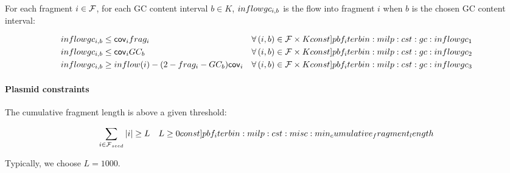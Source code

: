 For each fragment \(i \in \mathcal{F}{}\), for each GC content interval \(b \in K\), \(inflowgc_{i, b}\) is the flow into fragment \(i\) when \(b\) is the chosen GC content interval:
\begin{Constraint}
  \begin{align}
    \inflowgc{i}{b} & \leq \cov{i} \frag{i} & \forall (i, b) \in \Fragments{} \times K \cstlabel{pbf_iterbin:milp:cst:gc:inflowgc_1}  \\ %
    \inflowgc{i}{b} & \leq \cov{i} GC_b & \forall (i, b) \in \Fragments{} \times K \cstlabel{pbf_iterbin:milp:cst:gc:inflowgc_2}  \\ %
    \inflowgc{i}{b} & \geq inflow(i)  - (2 - \frag{i} - GC_b) \cov{i} & \forall (i, b) \in \Fragments{} \times K \cstlabel{pbf_iterbin:milp:cst:gc:inflowgc_3} %
  \end{align}
\end{Constraint}

\paragraph{Plasmid constraints}

The cumulative fragment length is above a given threshold:
%
\begin{Constraint}
  \begin{equation}
    \sum_{i \in \SeedFrags{}} |i| \geq L \quad L \geq 0 \cstlabel{pbf_iterbin:milp:cst:misc:min_cumulative_fragment_length} %
  \end{equation}
\end{Constraint}
%
Typically, we choose \(L = 1000\).